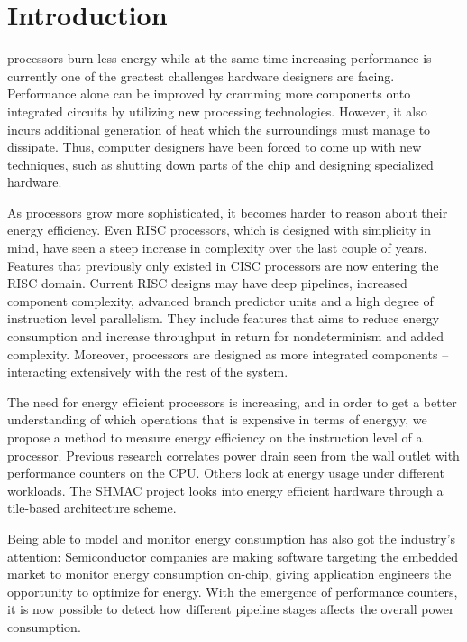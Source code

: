 \section{Introduction}

 processors burn less energy while at the same time
increasing performance is currently one of the greatest challenges hardware
designers are facing. Performance alone can be improved by cramming more
components onto integrated circuits \cite{moore1965cramming} by utilizing new
processing technologies. However, it also incurs additional generation of heat
which the surroundings must manage to dissipate. Thus, computer designers have
been forced to come up with new techniques, such as shutting down parts of the
chip \cite{esmaeilzadeh2011dark} and designing specialized hardware.

As processors grow more sophisticated, it becomes harder to reason about their
energy efficiency. Even RISC processors, which is designed with simplicity in
mind\cite{sivarama}, have seen a steep increase in complexity over the last
couple of years\cite{alf_egil_bogen_cisc_risc_blog}. Features that previously
only existed in CISC processors are now entering the RISC domain. Current RISC
designs may have deep pipelines, increased component complexity, advanced branch
predictor units and a high degree of instruction level parallelism. They include
features that aims to reduce energy consumption and increase throughput in
return for nondeterminism and added complexity. Moreover, processors are
designed as more integrated components -- interacting extensively with the rest
of the system.

The need for energy efficient processors is increasing, and in order to get a
better understanding of which operations that is expensive in terms of energyy,
we propose a method to measure energy efficiency on the instruction level of a
processor. Previous research correlates power drain seen from the wall outlet
with performance counters on the CPU\cite{singh}\cite{bertran}\cite{bircher}.
Others look at energy usage under different workloads\cite{carroll2010analysis}.
The SHMAC project\cite{Umuroglu662354}\cite{rusten2012implementing} looks into
energy efficient hardware through a tile-based architecture scheme.

Being able to model and monitor energy consumption has also
got the industry's attention: Semiconductor companies are making software
targeting the embedded market to monitor energy consumption on-chip, giving
application engineers the opportunity to optimize for energy. With the emergence
of performance counters, it is now possible to detect how different pipeline
stages affects the overall power consumption\cite{bertran}.

